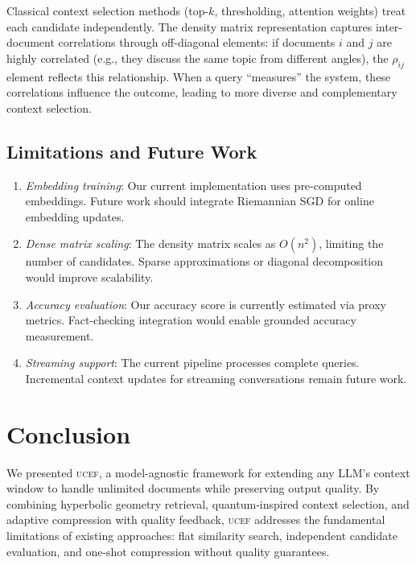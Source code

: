 \documentclass[11pt,letterpaper]{article}
\newcommand{\ucef}{\textsc{ucef}}
\begin{document}
Classical context selection methods (top-$k$, thresholding, attention
weights) treat each candidate independently.  The density matrix
representation captures inter-document correlations through off-diagonal
elements: if documents $i$ and $j$ are highly correlated (e.g., they
discuss the same topic from different angles), the $\rho_{ij}$ element
reflects this relationship.  When a query ``measures'' the system, these
correlations influence the outcome, leading to more diverse and
complementary context selection.

\subsection{Limitations and Future Work}

\begin{enumerate}[nosep]
  \item \emph{Embedding training}: Our current implementation uses
    pre-computed embeddings.  Future work should integrate Riemannian SGD
    for online embedding updates.
  \item \emph{Dense matrix scaling}: The density matrix scales as
    $O(n^{2})$, limiting the number of candidates.  Sparse approximations
    or diagonal decomposition would improve scalability.
  \item \emph{Accuracy evaluation}: Our accuracy score is currently
    estimated via proxy metrics.  Fact-checking integration would enable
    grounded accuracy measurement.
  \item \emph{Streaming support}: The current pipeline processes complete
    queries.  Incremental context updates for streaming conversations
    remain future work.
\end{enumerate}


\section{Conclusion}
\label{sec:conclusion}

We presented \ucef{}, a model-agnostic framework for extending any LLM's
context window to handle unlimited documents while preserving output quality.
By combining hyperbolic geometry retrieval, quantum-inspired context
selection, and adaptive compression with quality feedback, \ucef{} addresses
the fundamental limitations of existing approaches: flat similarity search,
independent candidate evaluation, and one-shot compression without quality
guarantees.
\end{document}
